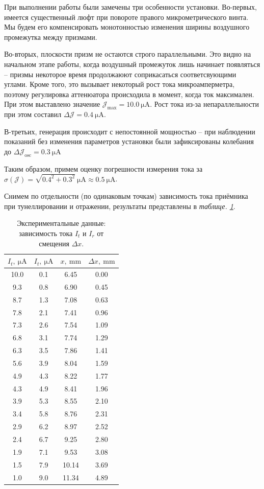 \documentclass[12pt, a4paper]{article}
\newcommand{\J}{\mathcal{J}}
\newcommand{\uA}{~\mathrm{\mu A}}
\newcommand{\mim}{~\mathrm{mm}}
\begin{document}
При выполнении работы были замечены три особенности установки. Во-первых, имеется существенный
люфт при повороте правого микрометрического винта. Мы будем его компенсировать монотонностью
изменения ширины воздушного промежутка между призмами.

Во-вторых, плоскости призм не остаются строго параллельными. Это видно на начальном этапе работы,
когда воздушный промежуток лишь начинает появляться -- призмы некоторое время продолжаюют 
соприкасаться соответсвующими углами. Кроме того, это вызывает некоторый рост тока
микроамперметра, поэтому регулировка аттенюатора происходила в момент, когда ток максимален.
При этом выставлено значение $\J_\text{max} = 10.0 \uA$. Рост тока из-за непараллельности
при этом составил $\Delta \J = 0.4 \uA$.

В-третьих, генерация происходит с непостоянной мощностью -- при наблюдении показаний без
изменения параметров установки были зафиксированы колебания до $\Delta \J _\text{osc} = 0.3\uA$

Таким образом, примем оценку погрешности измерения тока за $\sigma (\J) = \sqrt{0.4^2 + 0.3^2}\uA
\approx 0.5 \uA$.

Снимем по отдельности (по одинаковым точкам) зависимость тока приёмника при тунеллировании и 
отражении, результаты представлены в \textit{таблице. \ref{table:currents}}.

\begin{table}[H]
  \centering
  \begin{tabular}{|c|c|c|c|}
      \hline
      $I_t,\uA$ & $I_t,\uA$ & $x,\mim$ & $\Delta x,\mim$ \\ \hline
      10.0 & 0.1 & 6.45 & 0.00 \\ \hline
      9.3 & 0.8 & 6.90 & 0.45 \\ \hline
      8.7 & 1.3 & 7.08 & 0.63 \\ \hline
      7.8 & 2.1 & 7.41 & 0.96 \\ \hline
      7.3 & 2.6 & 7.54 & 1.09 \\ \hline
      6.8 & 3.1 & 7.74 & 1.29 \\ \hline
      6.3 & 3.5 & 7.86 & 1.41 \\ \hline
      5.6 & 3.9 & 8.04 & 1.59 \\ \hline
      4.9 & 4.3 & 8.22 & 1.77 \\ \hline
      4.3 & 4.9 & 8.41 & 1.96 \\ \hline
      3.9 & 5.3 & 8.55 & 2.10 \\ \hline
      3.4 & 5.8 & 8.76 & 2.31 \\ \hline
      2.9 & 6.2 & 8.97 & 2.52 \\ \hline
      2.4 & 6.7 & 9.25 & 2.80 \\ \hline
      1.9 & 7.1 & 9.53 & 3.08 \\ \hline
      1.5 & 7.9 & 10.14 & 3.69 \\ \hline
      1.0 & 9.0 & 11.34 & 4.89 \\ \hline
  \end{tabular}
  \caption{Экспериментальные данные: зависимость тока $I_t$ и $I_r$ от смещения $\Delta x$.}
  \label{table:currents}
\end{table}
\end{document}
